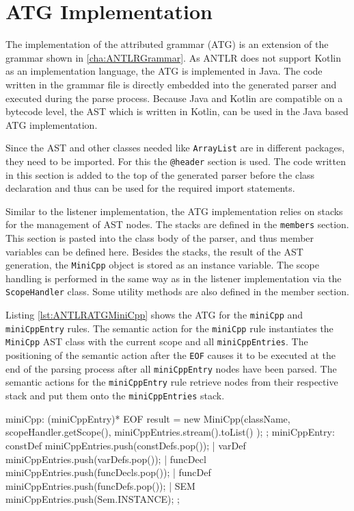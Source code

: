 \section{ATG Implementation}

The implementation of the attributed grammar (ATG) is an extension of the grammar shown in \ref{cha:ANTLRGrammar}. As ANTLR does not support Kotlin as an implementation language, the ATG is implemented in Java. The code written in the grammar file is directly embedded into the generated parser and executed during the parse process. Because Java and Kotlin are compatible on a bytecode level, the AST which is written in Kotlin, can be used in the Java based ATG implementation. 

Since the AST and other classes needed like \verb|ArrayList| are in different packages, they need to be imported. For this the \verb|@header| section is used. The code written in this section is added to the top of the generated parser before the class declaration and thus can be used for the required import statements. 

Similar to the listener implementation, the ATG implementation relies on stacks for the management of AST nodes. The stacks are defined in the \verb|members| section. This section is pasted into the class body of the parser, and thus member variables can be defined here. Besides the stacks, the result of the AST generation, the \verb|MiniCpp| object is stored as an instance variable. The scope handling is performed in the same way as in the listener implementation via the \verb|ScopeHandler| class. Some utility methods are also defined in the member section. 


Listing \ref{lst:ANTLRATGMiniCpp} shows the ATG for the \verb|miniCpp| and \verb|miniCppEntry| rules. The semantic action for the \verb|miniCpp| rule instantiates the \verb|MiniCpp| AST class with the current scope and all \verb|miniCppEntries|. The positioning of the semantic action after the \verb|EOF| causes it to be executed at the end of the parsing process after all \verb|miniCppEntry| nodes have been parsed. The semantic actions for the \verb|miniCppEntry| rule retrieve nodes from their respective stack and put them onto the \verb|miniCppEntries| stack.   

\begin{AntlrCode}[float,numbers=none,caption=ATG for the \texttt{miniCpp} and \texttt{miniCppEntry} rules., label=lst:ANTLRATGMiniCpp]
miniCpp: (miniCppEntry)* EOF                    
    { 
        result = new MiniCpp(className,
           scopeHandler.getScope(),
           miniCppEntries.stream().toList()
        ); 
    }
;
miniCppEntry:     
      constDef                  { miniCppEntries.push(constDefs.pop()); }
    | varDef                    { miniCppEntries.push(varDefs.pop()); }
    | funcDecl                  { miniCppEntries.push(funcDecls.pop()); }
    | funcDef                   { miniCppEntries.push(funcDefs.pop()); }
    | SEM                       { miniCppEntries.push(Sem.INSTANCE); }
;
\end{AntlrCode}
    

